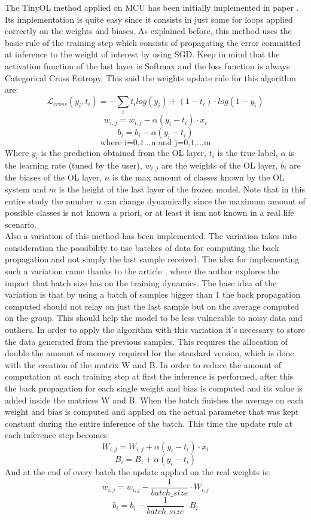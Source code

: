 \documentclass[12pt]{report}
\begin{document}
The TinyOL method applied on MCU has been initially implemented in paper \autocite{ren2021tinyol}. Its implementation is quite easy since it consists in just some for loops applied correctly on the weights and biases. As explained before, this method uses the basic rule of the training step which consists of propagating the error committed at inference to the weight of interest by using SGD. Keep in mind that the activation function of the last layer is Softmax and the loss function is always Categorical Cross Entropy. This said the weights update rule for this algorithm are:
%
\[ \mathcal{L}_{cross}(y_i, t_i)= - \sum_i t_i log(y_i) + (1-t_i)\cdot log(1-y_i)  \]
\[    w_{i,j} = w_{i,j} - \alpha (y_i - t_i) \cdot x_i \]
\[    b_i = b_i - \alpha (y_i - t_i) \]
\[    \text{where i=0,1..,n  and  j=0,1,..,m} \]
%
Where $y_i$ is the prediction obtained from the OL layer, $t_i$ is the true label, $\alpha$ is the learning rate (tuned by the user), $w_{i,j}$ are the weights of the OL layer, $b_i$ are the biases of the OL layer, $n$ is the max amount of classes known by the OL system and $m$ is the height of the last layer of the frozen model. Note that in this entire study the number $n$ can change dynamically since the maximum amount of possible classes is not known a priori, or at least it ism not known in a real life scenario. \\
Also a variation of this method has been implemented. The variation takes into consideration the possibility to use batches of data for computing the back propagation and not simply the last sample received. The idea for implementing such a variation came thanks to the article \autocite{batch_size_medium}, where the author explores the impact that batch size has on the training dynamics. The base idea of the variation is that by using a batch of samples bigger than 1 the back propagation computed should not relay on just the last sample but on the average computed on the group. This should help the model to be less vulnerable to noisy data and outliers. In order to apply the algorithm with this variation it's necessary to store the data generated from the previous samples. This requires the allocation of double the amount of memory required for the standard version, which is done with the creation of the matrix W and B. In order to reduce the amount of computation at each training step at first the inference is performed, after this the back propagation for each single weight and bias is computed and its value is added inside the matrices W and B. When the batch finishes the average on each weight and bias is computed and applied on the actual parameter that was kept constant during the entire inference of the batch. This time the update rule at each inference step becomes:
    \[     W_{i,j} = W_{i,j} + \alpha (y_i - t_i) \cdot x_i\]
    \[     B_i = B_i + \alpha  (y_i - t_i) \]
And at the end of every batch the update applied on the real weights is:
    \[     w_{i,j} = w_{i,j} - \frac{1}{batch\_size} \cdot W_{i,j} \] 
    \[     b_i = b_i - \frac{1}{batch\_size} \cdot B_i \]
    
\end{document}
